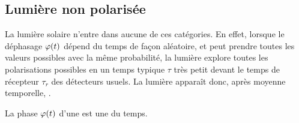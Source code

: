 \documentclass[12pt,fancy]{cours}
\begin{document}
\subsection{Lumière non polarisée}

La lumière solaire n'entre dans aucune de ces catégories. En effet, lorsque le déphasage $\varphi(t)$ dépend du temps de façon aléatoire, et peut prendre toutes les valeurs possibles avec la même probabilité, la lumière explore toutes les polarisations possibles en un temps typique $\tau$ très petit devant le temps de récepteur $\tau_r$ des détecteurs usuels. La lumière apparaît donc, après moyenne temporelle, .
\begin{definition}\label{def:}
  La phase $\varphi(t)$ d’une  est une  du temps.
\end{definition}
\end{document}

